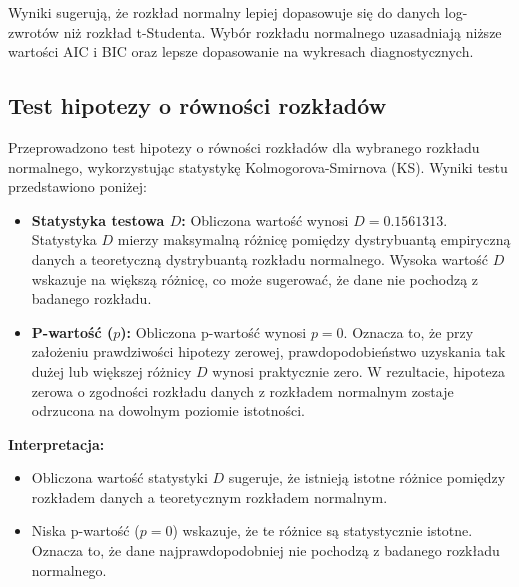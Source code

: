 \documentclass[a4paper,11pt]{article}
\begin{document}
Wyniki sugerują, że rozkład normalny lepiej dopasowuje się do danych log-zwrotów niż rozkład t-Studenta. Wybór rozkładu normalnego uzasadniają niższe wartości AIC i BIC oraz lepsze dopasowanie na wykresach diagnostycznych.

\subsection{Test hipotezy o równości rozkładów}

Przeprowadzono test hipotezy o równości rozkładów dla wybranego rozkładu normalnego, wykorzystując statystykę Kolmogorova-Smirnova (KS). Wyniki testu przedstawiono poniżej:

\begin{itemize}
    \item \textbf{Statystyka testowa \( D \):} Obliczona wartość wynosi \( D = 0.1561313 \). Statystyka \( D \) mierzy maksymalną różnicę pomiędzy dystrybuantą empiryczną danych a teoretyczną dystrybuantą rozkładu normalnego. Wysoka wartość \( D \) wskazuje na większą różnicę, co może sugerować, że dane nie pochodzą z badanego rozkładu.
    \item \textbf{P-wartość (\( p \)):} Obliczona p-wartość wynosi \( p = 0 \). Oznacza to, że przy założeniu prawdziwości hipotezy zerowej, prawdopodobieństwo uzyskania tak dużej lub większej różnicy \( D \) wynosi praktycznie zero. W rezultacie, hipoteza zerowa o zgodności rozkładu danych z rozkładem normalnym zostaje odrzucona na dowolnym poziomie istotności.
\end{itemize}

\textbf{Interpretacja:}
\begin{itemize}
    \item Obliczona wartość statystyki \( D \) sugeruje, że istnieją istotne różnice pomiędzy rozkładem danych a teoretycznym rozkładem normalnym. 
    \item Niska p-wartość (\( p = 0 \)) wskazuje, że te różnice są statystycznie istotne. Oznacza to, że dane najprawdopodobniej nie pochodzą z badanego rozkładu normalnego.
\end{itemize}
\end{document}
